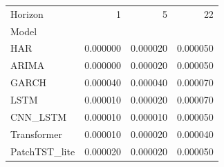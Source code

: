 \begin{tabular}{lrrr}
\toprule
Horizon & 1 & 5 & 22 \\
Model &  &  &  \\
\midrule
HAR & 0.000000 & 0.000020 & 0.000050 \\
ARIMA & 0.000000 & 0.000020 & 0.000050 \\
GARCH & 0.000040 & 0.000040 & 0.000070 \\
LSTM & 0.000010 & 0.000020 & 0.000070 \\
CNN_LSTM & 0.000010 & 0.000010 & 0.000050 \\
Transformer & 0.000010 & 0.000020 & 0.000040 \\
PatchTST_lite & 0.000020 & 0.000020 & 0.000050 \\
\bottomrule
\end{tabular}
